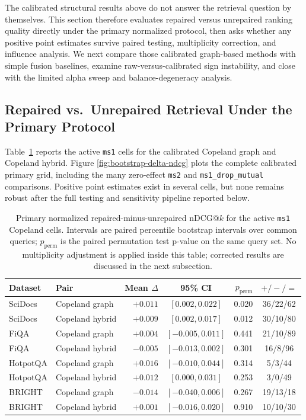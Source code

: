 \documentclass[manuscript,anonymous,review]{acmart}
\begin{document}
The calibrated structural results above do not answer the retrieval question by
themselves. This section therefore evaluates repaired versus unrepaired ranking
quality directly under the primary normalized protocol, then asks whether any
positive point estimates survive paired testing, multiplicity correction, and
influence analysis. We next compare those calibrated graph-based methods with
simple fusion baselines, examine raw-versus-calibrated sign instability, and
close with the limited alpha sweep and balance-degeneracy analysis.

\subsection{Repaired vs.\ Unrepaired Retrieval Under the Primary Protocol}

Table~\ref{tab:bootstrap-delta-ndcg} reports the active \texttt{ms1} cells for
the calibrated Copeland graph and Copeland hybrid. Figure
\ref{fig:bootstrap-delta-ndcg} plots the complete calibrated primary grid,
including the many zero-effect \texttt{ms2} and \texttt{ms1\_drop\_mutual}
comparisons. Positive point estimates exist in several cells, but none remains
robust after the full testing and sensitivity pipeline reported below.

\begin{table}[t]
  \caption{Primary normalized repaired-minus-unrepaired nDCG@$k$ for the
    active \texttt{ms1} Copeland cells. Intervals are paired percentile
    bootstrap intervals over common queries; $p_{\mathrm{perm}}$ is the paired
    permutation test p-value on the same query set. No multiplicity adjustment
    is applied inside this table; corrected results are discussed in the next
    subsection.}
  \label{tab:bootstrap-delta-ndcg}
  \scriptsize
  \begin{tabular}{llrcrc}
    \toprule
    Dataset & Pair & Mean $\Delta$ & 95\% CI & $p_{\mathrm{perm}}$ & $+/-/=$ \\
    \midrule
    SciDocs  & Copeland graph  & $+0.011$ & $[0.002, 0.022]$  & 0.020 & 36/22/62 \\
    SciDocs  & Copeland hybrid & $+0.009$ & $[0.002, 0.017]$  & 0.012 & 30/10/80 \\
    FiQA     & Copeland graph  & $+0.004$ & $[-0.005, 0.011]$ & 0.441 & 21/10/89 \\
    FiQA     & Copeland hybrid & $-0.005$ & $[-0.013, 0.002]$ & 0.301 & 16/8/96 \\
    HotpotQA & Copeland graph  & $+0.016$ & $[-0.010, 0.044]$ & 0.314 & 5/3/44 \\
    HotpotQA & Copeland hybrid & $+0.012$ & $[0.000, 0.031]$  & 0.253 & 3/0/49 \\
    BRIGHT   & Copeland graph  & $-0.014$ & $[-0.040, 0.006]$ & 0.267 & 19/13/18 \\
    BRIGHT   & Copeland hybrid & $+0.001$ & $[-0.016, 0.020]$ & 0.910 & 10/10/30 \\
    \bottomrule
  \end{tabular}
\end{table}
\end{document}

